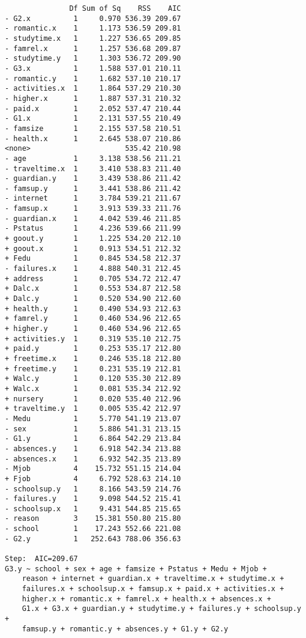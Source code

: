 \documentclass[11pt]{article}
\begin{document}
\begin{enumerate}
\begin{verbatim}
               Df Sum of Sq    RSS    AIC
- G2.x          1     0.970 536.39 209.67
- romantic.x    1     1.173 536.59 209.81
- studytime.x   1     1.227 536.65 209.85
- famrel.x      1     1.257 536.68 209.87
- studytime.y   1     1.303 536.72 209.90
- G3.x          1     1.588 537.01 210.11
- romantic.y    1     1.682 537.10 210.17
- activities.x  1     1.864 537.29 210.30
- higher.x      1     1.887 537.31 210.32
- paid.x        1     2.052 537.47 210.44
- G1.x          1     2.131 537.55 210.49
- famsize       1     2.155 537.58 210.51
- health.x      1     2.645 538.07 210.86
<none>                      535.42 210.98
- age           1     3.138 538.56 211.21
- traveltime.x  1     3.410 538.83 211.40
- guardian.y    1     3.439 538.86 211.42
- famsup.y      1     3.441 538.86 211.42
- internet      1     3.784 539.21 211.67
- famsup.x      1     3.913 539.33 211.76
- guardian.x    1     4.042 539.46 211.85
- Pstatus       1     4.236 539.66 211.99
+ goout.y       1     1.225 534.20 212.10
+ goout.x       1     0.913 534.51 212.32
+ Fedu          1     0.845 534.58 212.37
- failures.x    1     4.888 540.31 212.45
+ address       1     0.705 534.72 212.47
+ Dalc.x        1     0.553 534.87 212.58
+ Dalc.y        1     0.520 534.90 212.60
+ health.y      1     0.490 534.93 212.63
+ famrel.y      1     0.460 534.96 212.65
+ higher.y      1     0.460 534.96 212.65
+ activities.y  1     0.319 535.10 212.75
+ paid.y        1     0.253 535.17 212.80
+ freetime.x    1     0.246 535.18 212.80
+ freetime.y    1     0.231 535.19 212.81
+ Walc.y        1     0.120 535.30 212.89
+ Walc.x        1     0.081 535.34 212.92
+ nursery       1     0.020 535.40 212.96
+ traveltime.y  1     0.005 535.42 212.97
- Medu          1     5.770 541.19 213.07
- sex           1     5.886 541.31 213.15
- G1.y          1     6.864 542.29 213.84
- absences.y    1     6.918 542.34 213.88
- absences.x    1     6.932 542.35 213.89
- Mjob          4    15.732 551.15 214.04
+ Fjob          4     6.792 528.63 214.10
- schoolsup.y   1     8.166 543.59 214.76
- failures.y    1     9.098 544.52 215.41
- schoolsup.x   1     9.431 544.85 215.65
- reason        3    15.381 550.80 215.80
- school        1    17.243 552.66 221.08
- G2.y          1   252.643 788.06 356.63

Step:  AIC=209.67
G3.y ~ school + sex + age + famsize + Pstatus + Medu + Mjob + 
    reason + internet + guardian.x + traveltime.x + studytime.x + 
    failures.x + schoolsup.x + famsup.x + paid.x + activities.x + 
    higher.x + romantic.x + famrel.x + health.x + absences.x + 
    G1.x + G3.x + guardian.y + studytime.y + failures.y + schoolsup.y + 
    famsup.y + romantic.y + absences.y + G1.y + G2.y


\end{verbatim}
\end{enumerate}
\end{document}
